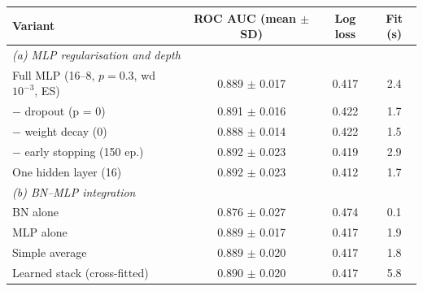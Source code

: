 \begin{tabular}{lccc}
\toprule
Variant & ROC AUC (mean $\pm$ SD) & Log loss & Fit (s) \\
\midrule
\multicolumn{4}{l}{\textit{(a) MLP regularisation and depth}} \\
Full MLP (16--8, $p{=}0.3$, wd $10^{-3}$, ES) & 0.889 $\pm$ 0.017 & 0.417 & 2.4 \\
$-$ dropout (p = 0) & 0.891 $\pm$ 0.016 & 0.422 & 1.7 \\
$-$ weight decay (0) & 0.888 $\pm$ 0.014 & 0.422 & 1.5 \\
$-$ early stopping (150 ep.) & 0.892 $\pm$ 0.023 & 0.419 & 2.9 \\
One hidden layer (16) & 0.892 $\pm$ 0.023 & 0.412 & 1.7 \\
\midrule
\multicolumn{4}{l}{\textit{(b) BN--MLP integration}} \\
BN alone & 0.876 $\pm$ 0.027 & 0.474 & 0.1 \\
MLP alone & 0.889 $\pm$ 0.017 & 0.417 & 1.9 \\
Simple average & 0.889 $\pm$ 0.020 & 0.417 & 1.8 \\
Learned stack (cross-fitted) & 0.890 $\pm$ 0.020 & 0.417 & 5.8 \\
\bottomrule
\end{tabular}
